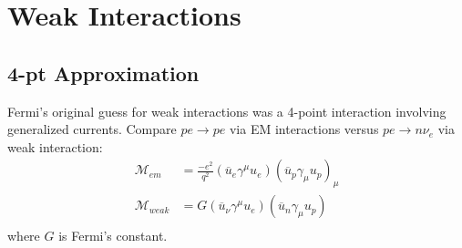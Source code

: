 \documentclass[12pt]{article}
\theoremstyle{definition}
\begin{document}
\section{Weak Interactions}

\subsection{4-pt Approximation}
Fermi's original guess for weak interactions was a 4-point interaction involving generalized currents.
Compare $pe \to pe$ via EM interactions versus $pe \to n \nu_e$ via weak interaction:
\begin{equation*}
\begin{split}
    \mathcal{M}_{em} &= \frac{-e^2}{q^2} \left( \overline{u}_e \gamma^\mu u_e \right) \left( \overline{u}_p \gamma_\mu u_p \right)_\mu \\
    \mathcal{M}_{weak} &= G \left( \overline{u}_\nu \gamma^\mu u_e \right) \left( \overline{u}_n \gamma_\mu u_p \right) \\
\end{split}
\end{equation*}
where $G$ is Fermi's constant.
\end{document}
